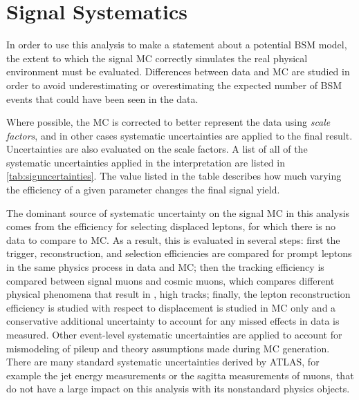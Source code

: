 \chapter{Signal Systematics}
\label{chap:systematics}

In order to use this analysis to make a statement about a potential \ac{BSM} model, the extent to which the signal \ac{MC} correctly simulates the real physical environment must be evaluated. Differences between data and \ac{MC} are studied in order to avoid underestimating or overestimating the expected number of \ac{BSM} events that could have been seen in the data.

Where possible, the \ac{MC} is corrected to better represent the data using \emph{scale factors}, and in other cases systematic uncertainties are applied to the final result. Uncertainties are also evaluated on the scale factors. A list of all of the systematic uncertainties applied in the interpretation are listed in \autoref{tab:siguncertainties}. The value listed in the table describes how much varying the efficiency of a given parameter changes the final signal yield. 

The dominant source of systematic uncertainty on the signal \ac{MC} in this analysis comes from the efficiency for selecting displaced leptons, for which there is no data to compare to \ac{MC}. As a result, this is evaluated in several steps: first the trigger, reconstruction, and selection efficiencies are compared for prompt leptons in the same physics process in data and \ac{MC}; then the tracking efficiency is compared between signal muons and cosmic muons, which compares different physical phenomena that result in \pt, high \absdz tracks; finally, the lepton reconstruction efficiency is studied with respect to displacement is studied in \ac{MC} only and a conservative additional uncertainty to account for any missed effects in data is measured. Other event-level systematic uncertainties are applied to account for mismodeling of pileup and theory assumptions made during \ac{MC} generation. There are many standard systematic uncertainties derived by \ac{ATLAS}, for example the jet energy measurements or the sagitta measurements of muons, that do not have a large impact on this analysis with its nonstandard physics objects.


